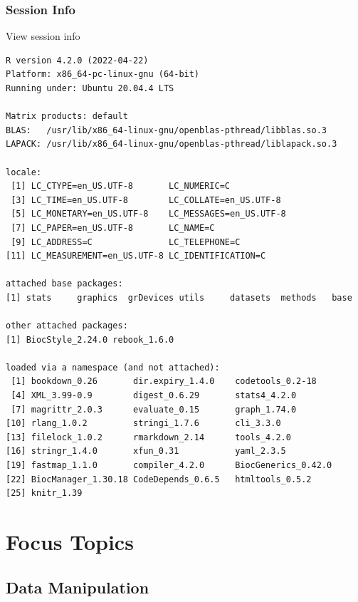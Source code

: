 \documentclass[
]{book}
\begin{document}
\hypertarget{session-info-1}{%
\section*{Session Info}\label{session-info-1}}

View session info

\begin{verbatim}
R version 4.2.0 (2022-04-22)
Platform: x86_64-pc-linux-gnu (64-bit)
Running under: Ubuntu 20.04.4 LTS

Matrix products: default
BLAS:   /usr/lib/x86_64-linux-gnu/openblas-pthread/libblas.so.3
LAPACK: /usr/lib/x86_64-linux-gnu/openblas-pthread/liblapack.so.3

locale:
 [1] LC_CTYPE=en_US.UTF-8       LC_NUMERIC=C              
 [3] LC_TIME=en_US.UTF-8        LC_COLLATE=en_US.UTF-8    
 [5] LC_MONETARY=en_US.UTF-8    LC_MESSAGES=en_US.UTF-8   
 [7] LC_PAPER=en_US.UTF-8       LC_NAME=C                 
 [9] LC_ADDRESS=C               LC_TELEPHONE=C            
[11] LC_MEASUREMENT=en_US.UTF-8 LC_IDENTIFICATION=C       

attached base packages:
[1] stats     graphics  grDevices utils     datasets  methods   base     

other attached packages:
[1] BiocStyle_2.24.0 rebook_1.6.0    

loaded via a namespace (and not attached):
 [1] bookdown_0.26       dir.expiry_1.4.0    codetools_0.2-18   
 [4] XML_3.99-0.9        digest_0.6.29       stats4_4.2.0       
 [7] magrittr_2.0.3      evaluate_0.15       graph_1.74.0       
[10] rlang_1.0.2         stringi_1.7.6       cli_3.3.0          
[13] filelock_1.0.2      rmarkdown_2.14      tools_4.2.0        
[16] stringr_1.4.0       xfun_0.31           yaml_2.3.5         
[19] fastmap_1.1.0       compiler_4.2.0      BiocGenerics_0.42.0
[22] BiocManager_1.30.18 CodeDepends_0.6.5   htmltools_0.5.2    
[25] knitr_1.39         
\end{verbatim}

\hypertarget{part-focus-topics}{%
\part{Focus Topics}\label{part-focus-topics}}

\hypertarget{datamanipulation}{%
\chapter{Data Manipulation}\label{datamanipulation}}
\end{document}
